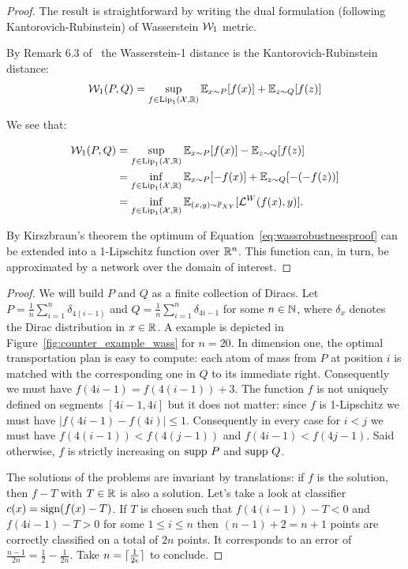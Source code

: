         \mcriswass*
        \begin{proof} The result is straightforward by writing the dual formulation (following Kantorovich-Rubinstein) of Wasserstein $\mathcal{W}_1$ metric.  
          
        By Remark 6.3 of~\cite{villani2008optimal} the Wasserstein-1 distance is the Kantorovich-Rubinstein distance:  
        $$\mathcal{W}_1(P,Q)=\sup_{f\in\text{Lip}_1(\mathcal{X},\mathbb{R})}\mathbb{E}_{x\sim P}[f(x)]+\mathbb{E}_{z\sim Q}[f(z)]$$
        
        We see that:
        
        \begin{equation}\label{eq:wassrobustnessproof}
            \begin{aligned}
            \mathcal{W}_1(P,Q)&=\sup_{f\in\text{Lip}_1(\mathcal{X},\mathbb{R})}\mathbb{E}_{x\sim P}[f(x)]-\mathbb{E}_{z\sim Q}[f(z)]\\
            &=\inf_{f\in\text{Lip}_1(\mathcal{X},\mathbb{R})}\mathbb{E}_{x\sim P}[-f(x)]+\mathbb{E}_{z\sim Q}[-(-f(z))]\\
            &=\inf_{f\in\text{Lip}_1(\mathcal{X},\mathbb{R})}\mathbb{E}_{(x,y)\sim\mathbb{P}_{XY}}[\mathcal{L}^W(f(x),y)].
            \end{aligned}
        \end{equation}
        
        By Kirszbraun's theorem the optimum of Equation~\ref{eq:wassrobustnessproof} can be extended into a 1-Lipschitz function over $\mathbb{R}^n$. This function can, in turn, be approximated by a \LipCl network over the domain of interest.  
        \end{proof}
        
        \weakwass*
        \begin{proof}
            We will build $P$ and $Q$ as a finite collection of Diracs. Let $P=\frac{1}{n}\sum_{i=1}^n\delta_{4(i-1)}$ and $Q=\frac{1}{n}\sum_{i=1}^n\delta_{4i-1}$ for some $n\in\mathbb{N}$, where $\delta_x$ denotes the Dirac distribution in $x\in\mathbb{R}$. A example is depicted in Figure~\ref{fig:counter_example_wass} for $n=20$. In dimension one, the optimal transportation plan is easy to compute: each atom of mass from $P$ at position $i$ is matched with the corresponding one in $Q$ to its immediate right. Consequently we must have $f(4i-1)=f(4(i-1))+3$. The function $f$ is not uniquely defined on segments $[4i-1, 4i]$ but it does not matter: since $f$ is \mbox{1-Lipschitz} we must have $|f(4i-1)-f(4i)|\leq 1$. Consequently in every case for $i<j$ we must have $f(4(i-1))<f(4(j-1))$ and $f(4i-1)<f(4j-1)$.  Said otherwise, $f$ is strictly increasing on $\text{supp }P$ and $\text{supp }Q$.  
  
            The solutions of the problems are invariant by translations: if $f$ is the solution, then $f - T$ with $T\in\mathbb{R}$ is also a solution. Let's take a look at classifier $c(x)=\text{sign}{(f(x)-T)}$. If $T$ is chosen such that $f(4(i-1))-T<0$ and $f(4i-1)-T>0$ for some $1\leq i\leq n$ then $(n-1)+2=n+1$ points are correctly classified on a total of $2n$ points. It corresponds to an error of $\frac{n-1}{2n}=\frac{1}{2}-\frac{1}{2n}$. Take $n=\lceil\frac{1}{2\epsilon}\rceil$ to conclude.  
        \end{proof}
  
